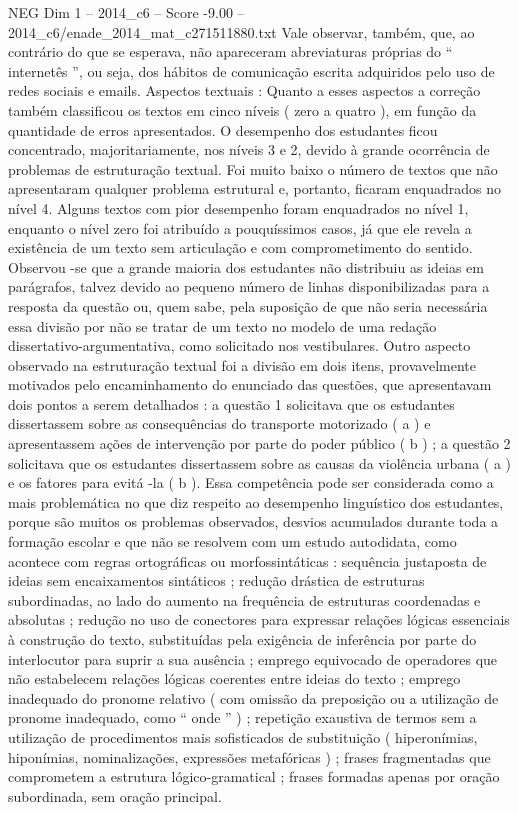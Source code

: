 \begin{textsample}{NEG Dim 1 – 2014\_c6 – Score -9.00 – 2014\_c6/enade\_2014\_mat\_c271511880.txt}
Vale observar, também, que, ao contrário do que se esperava, não apareceram abreviaturas próprias do “ internetês ”, ou seja, dos hábitos de comunicação escrita adquiridos pelo uso de redes sociais e emails.
Aspectos textuais : Quanto a esses aspectos a correção também classificou os textos em cinco níveis ( zero a quatro ), em função da quantidade de erros apresentados.
O desempenho dos estudantes ficou concentrado, majoritariamente, nos níveis 3 e 2, devido à grande ocorrência de problemas de estruturação textual.
Foi muito baixo o número de textos que não apresentaram qualquer problema estrutural e, portanto, ficaram enquadrados no nível 4.
Alguns textos com pior desempenho foram enquadrados no nível 1, enquanto o nível zero foi atribuído a pouquíssimos casos, já que ele revela a existência de um texto sem articulação e com comprometimento do sentido.
Observou -se que a grande maioria dos estudantes não distribuiu as ideias em parágrafos, talvez devido ao pequeno número de linhas disponibilizadas para a resposta da questão ou, quem sabe, pela suposição de que não seria necessária essa divisão por não se tratar de um texto no modelo de uma redação dissertativo-argumentativa, como solicitado nos vestibulares.
Outro aspecto observado na estruturação textual foi a divisão em dois itens, provavelmente motivados pelo encaminhamento do enunciado das questões, que apresentavam dois pontos a serem detalhados : a questão 1 solicitava que os estudantes dissertassem sobre as consequências do transporte motorizado ( a ) e apresentassem ações de intervenção por parte do poder público ( b ) ; a questão 2 solicitava que os estudantes dissertassem sobre as causas da violência urbana ( a ) e os fatores para evitá -la ( b ).
Essa competência pode ser considerada como a mais problemática no que diz respeito ao desempenho linguístico dos estudantes, porque são muitos os problemas observados, desvios acumulados durante toda a formação escolar e que não se resolvem com um estudo autodidata, como acontece com regras ortográficas ou morfossintáticas : sequência justaposta de ideias sem encaixamentos sintáticos ; redução drástica de estruturas subordinadas, ao lado do aumento na frequência de estruturas coordenadas e absolutas ; redução no uso de conectores para expressar relações lógicas essenciais à construção do texto, substituídas pela exigência de inferência por parte do interlocutor para suprir a sua ausência ; emprego equivocado de operadores que não estabelecem relações lógicas coerentes entre ideias do texto ; emprego inadequado do pronome relativo ( com omissão da preposição ou a utilização de pronome inadequado, como “ onde ” ) ; repetição exaustiva de termos sem a utilização de procedimentos mais sofisticados de substituição ( hiperonímias, hiponímias, nominalizações, expressões metafóricas ) ; frases fragmentadas que comprometem a estrutura lógico-gramatical ; frases formadas apenas por oração subordinada, sem oração principal.

\end{textsample}
